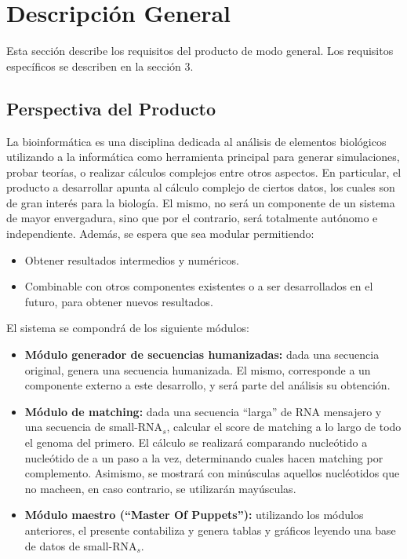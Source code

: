 \documentclass[12pt,a4paper,spanish]{article}
\begin{document}
\section{Descripción General}
\label{section-desc-gral}
Esta sección describe los requisitos del producto de modo general. Los
requisitos específicos se describen en la sección 3.

\subsection{Perspectiva del Producto}
\par La bioinformática es una disciplina dedicada al análisis de elementos biológicos utilizando a la informática como herramienta principal para generar simulaciones, probar teorías, o realizar cálculos complejos entre otros aspectos. En particular, el producto a desarrollar apunta al cálculo complejo de ciertos datos, los cuales son de gran interés para la biología. El mismo, no será un componente de un sistema de mayor envergadura, sino que por el contrario, será totalmente autónomo e independiente. Además, se espera que sea modular permitiendo:
	\begin{itemize} 
		\item Obtener resultados intermedios y numéricos.
		\item Combinable con otros componentes existentes o a ser desarrollados en el futuro, para obtener nuevos resultados.
	\end{itemize}
\par El sistema se compondrá de los siguiente módulos:
	\begin{itemize}
		\item \textbf{Módulo generador de secuencias humanizadas:} dada una secuencia original, genera una secuencia humanizada. El mismo, corresponde a 																	un componente externo a este desarrollo, y será parte del análisis su obtención.
		\item \textbf{Módulo de matching:} dada una secuencia “larga” de RNA mensajero y una secuencia de small-RNA$_s$, calcular el score de matching a 
											lo largo de todo el genoma del primero. El cálculo se realizará comparando nucleótido a nucleótido de a un
											paso a la vez, determinando cuales hacen matching por complemento. Asimismo, se mostrará con minúsculas 											aquellos nucléotidos que no macheen, en caso contrario, se utilizarán mayúsculas.
		\item \textbf{Módulo maestro (“Master Of Puppets”):} utilizando los módulos anteriores, el presente contabiliza y genera tablas y gráficos leyendo 																una base de datos de small-RNA$_s$. 
	\end{itemize}
\end{document}

